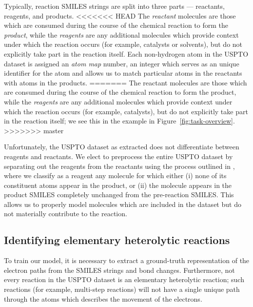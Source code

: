 Typically, reaction SMILES strings are split into three parts --- reactants, reagents, and products.
<<<<<<< HEAD
The {\em reactant} molecules are those which are consumed during the course of the chemical reaction to form the {\em product}, 
while the {\em reagents} are any additional molecules which provide context under which the reaction occurs (for example, catalysts or solvents),
but do not explicitly take part in the reaction  itself.
Each non-hydrogen atom in the USPTO dataset is assigned an {\em atom map} number, an integer which serves as an unique identifier for the atom and allows us to match particular atoms in the reactants with atoms in the products.
=======
The reactant molecules are those which are consumed during the course of the chemical reaction to form the  product, 
while the {\em reagents} are any additional molecules which provide context under which the reaction occurs (for example, catalysts),
but do not explicitly take part in the reaction itself; we see this in the example in Figure~\ref{fig:task-overview}.
>>>>>>> master

Unfortunately, the USPTO dataset as extracted does not differentiate between reagents and reactants.
We elect to preprocess the entire USPTO dataset by separating out the reagents from the reactants using the process outlined in \citet{schwaller2017found}, where we classify as a reagent any molecule for which either 
(i) none of its constituent atoms appear in the product, or 
(ii) the molecule appears in the product SMILES completely unchanged from the pre-reaction SMILES.
This allows us to properly model molecules which are included in the dataset but do not materially contribute to the reaction.

\subsection{Identifying elementary heterolytic reactions}

To train our model, it is necessary to extract a ground-truth representation of the electron paths from the SMILES strings and bond changes.
Furthermore, not every reaction in the USPTO dataset is an elementary heterolytic reaction; 
such reactions (for example, multi-step reactions) will not have a single unique path through the atoms 
which describes the movement of the electrons.

